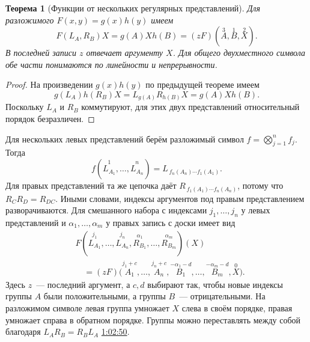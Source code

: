 \documentclass[11pt,a4paper]{article}
\theoremstyle{plain}
\newtheorem{theorem}{Теорема}[section]
\theoremstyle{definition}
\newcommand{\at}[3]{\href{https://www.youtube.com/watch?v=#1&t=#2s}{#3}}
\begin{document}
\begin{theorem}[Функции от нескольких регулярных представлений]
Для разложимого $F(x,y)=g(x)h(y)$ имеем
\[
 F(L_A,R_B)X=g(A)Xh(B)
      =(zF)(\overset3 A,\overset1 B,\overset2 X).
\]
В последней записи $z$ отвечает аргументу $X$.
Для общего двухместного символа обе части понимаются
по линейности и непрерывности.
\end{theorem}
\begin{proof}
На произведении $g(x)h(y)$ по предыдущей теореме имеем
\[
 g(L_A)h(R_B)X=L_{g(A)}R_{h(B)}X=g(A)Xh(B).
\]
Поскольку $L_A$ и $R_B$ коммутируют, для этих двух
представлений относительный порядок безразличен.
\end{proof}
Для нескольких левых представлений берём разложимый
символ $f=\bigotimes_{j=1}^n f_j$. Тогда
\[
 f(\overset1{L_{A_1}},\ldots,\overset n{L_{A_n}})
   =L_{\,f_n(A_n)\cdots f_1(A_1)} .
\]
Для правых представлений та же цепочка даёт
$R_{\,f_1(A_1)\cdots f_n(A_n)}$, потому что
$R_CR_D=R_{DC}$. Иными словами, индексы аргументов
под правым представлением разворачиваются.
Для смешанного набора с индексами $j_1,\ldots,j_n$ у
левых представлений и $\alpha_1,\ldots,\alpha_m$ у
правых запись с доски имеет вид
\[
 \begin{aligned}
 &F(\overset{j_1}{L_{A_1}},\ldots,\overset{j_n}{L_{A_n}},
    \overset{\alpha_1}{R_{B_1}},\ldots,
    \overset{\alpha_m}{R_{B_m}})(X)\\
 &\quad=(zF)\bigl(
    \overset{j_1+c}{A_1},\ldots,\overset{j_n+c}{A_n},
    \overset{-\alpha_1-d}{B_1},\ldots,
    \overset{-\alpha_m-d}{B_m},\overset{0}{X}\bigr).
 \end{aligned}
\]
Здесь $z$~--- последний аргумент, а $c,d$ выбирают так,
чтобы новые индексы группы $A$ были положительными, а
группы $B$~--- отрицательными. На разложимом символе
левая группа умножает $X$ слева в своём порядке, правая
умножает справа в обратном порядке. Группы можно
переставлять между собой благодаря $L_AR_B=R_BL_A$
\at{8kQuUxC-VVg}{3770}{1:02:50}.
\end{document}
